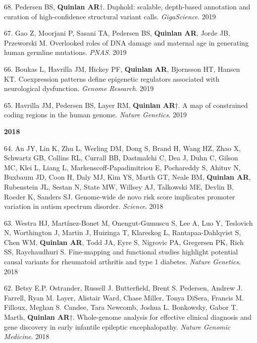 \documentclass[margin,line]{cv}
\begin{document}
\begin{resume}
\begin{list}{*}{}
    \item[68.] Pedersen BS, \textbf{Quinlan AR}$\dagger$. Duphold: scalable, depth-based annotation and curation of high-confidence structural variant calls. \emph{GigaScience}. 2019

    \item[67.] Gao Z, Moorjani P, Sasani TA, Pedersen BS, \textbf{Quinlan AR}, Jorde JB, Przeworski M. Overlooked roles of DNA damage and maternal age in generating human germline mutations. \emph{PNAS}. 2019

    \item[66.] Boukas L, Havrilla JM, Hickey PF, \textbf{Quinlan AR}, Bjornsson HT, Hansen KT. Coexpression patterns define epigenetic regulators associated with neurological dysfunction. \emph{Genome Research}. 2019

    \item[65.] Havrilla JM, Pedersen BS, Layer RM, \textbf{   Quinlan AR}$\dagger$. A map of constrained coding regions in the human genome. \emph{Nature Genetics}. 2019
  
    \end{list}


    \textbf{2018} \\

    \begin{list}{*}{}


    \item[64.] An JY, Lin K, Zhu L, Werling DM, Dong S, Brand H, Wang HZ, Zhao X, Schwartz GB, Collins RL, Currall BB, Dastmalchi C, Dea J, Duhn C, Gilson MC, Klei L, Liang L, Markenscoff-Papadimitriou E, Pochareddy S, Ahituv N, Buxbaum JD, Coon H, Daly MJ, Kim YS, Marth GT, Neale BM, \textbf{Quinlan AR}, Rubenstein JL, Sestan N, State MW, Willsey AJ, Talkowski ME, Devlin B, Roeder K, Sanders SJ. Genome-wide de novo risk score implicates promoter variation in autism spectrum disorder. \emph{Science}. 2018

    \item[63.] Westra HJ, Martínez-Bonet M, Onengut-Gumuscu S, Lee A, Luo Y, Teslovich N, Worthington J, Martin J, Huizinga T, Klareskog L, Rantapaa-Dahlqvist S, Chen WM, \textbf{Quinlan AR}, Todd JA, Eyre S, Nigrovic PA, Gregersen PK, Rich SS, Raychaudhuri S. Fine-mapping and functional studies highlight potential causal variants for rheumatoid arthritis and type 1 diabetes. \emph{Nature Genetics}. 2018

    \item[62.] Betsy E.P. Ostrander, Russell J. Butterfield, Brent S. Pedersen, Andrew J. Farrell, Ryan M. Layer, Alistair Ward, Chase Miller, Tonya DiSera, Francis M. Filloux, Meghan S. Candee, Tara Newcomb, Joshua L. Bonkowsky, Gabor T. Marth, \textbf{Quinlan AR}$\dagger$. Whole-genome analysis for effective clinical diagnosis and gene discovery in early infantile epileptic encephalopathy. \emph{Nature Genomic Medicine}. 2018


\end{list}
\end{resume}
\end{document}

